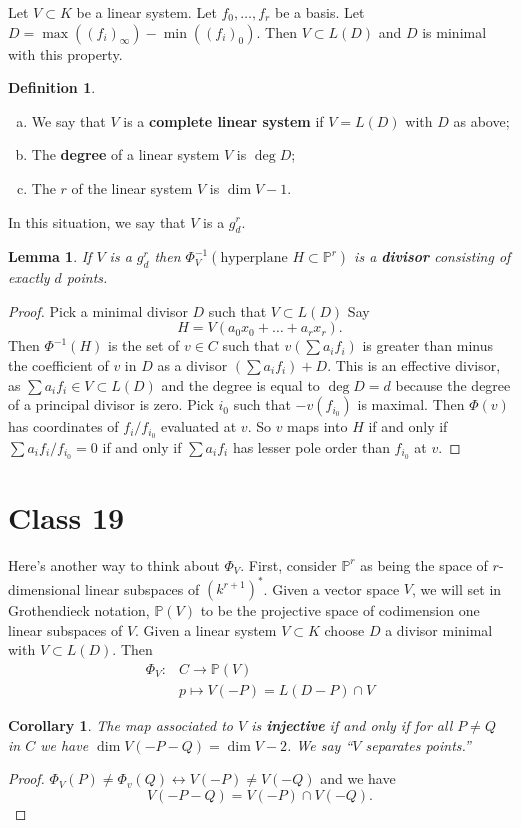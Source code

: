 \documentclass{article}
\newcommand{\Proj}{\mathbb{P}}
\theoremstyle{plain}
\newtheorem{lem}[thm]{Lemma}
\newtheorem{cor}[thm]{Corollary}
\theoremstyle{definition}
\newtheorem{defn}{Definition}
\theoremstyle{remark}
\begin{document}
Let $V\subset K$ be a linear system. Let $f_0,\ldots, f_r$ be a basis. Let $D=\max((f_i)_\infty)-\min((f_i)_0)$. Then $V\subset L(D)$ and $D$ is minimal with this property.

\begin{defn}\hspace{1mm}
\begin{enumerate}[(a)]
\item We say that $V$ is a \textbf{complete linear system} if $V=L(D)$ with $D$ as above;
\item The \textbf{degree} of a linear system $V$ is $\deg D$;
\item The $r$ of the linear system $V$ is $\dim V-1$.
\end{enumerate}
In this situation, we say that $V$ is a $g_d^r$.
\end{defn}

\begin{lem}
\label{L106}
If $V$ is a $g^r_d$ then $\Phi^{-1}_V(\text{hyperplane }H\subset \Proj^r)$ is a \textbf{divisor} consisting of exactly $d$ points.
\end{lem}
\begin{proof}
Pick a minimal divisor $D$ such that $V\subset L(D)$ Say
\[H=V(a_0x_0+\ldots+a_rx_r).\]
Then $\Phi^{-1}(H)$ is the set of $v\in C$ such that $v(\sum a_i f_i)$ is greater than minus the coefficient of $v$ in $D$ as a divisor $(\sum a_i f_i)+D$. This is an effective divisor, as $\sum a_if_i\in V\subset L(D)$ and the degree is equal to $\deg D=d$ because the degree of a principal divisor is zero. Pick $i_0$ such that $-v(f_{i_0})$ is maximal. Then $\Phi(v)$ has coordinates of $f_i/f_{i_0}$ evaluated at $v$. So $v$ maps into $H$ if and only if $\sum a_if_i/f_{i_0}=0$ if and only if $\sum a_i f_i$ has lesser pole order than $f_{i_0}$ at $v$.
\end{proof}

\section*{Class 19}

Here's another way to think about $\Phi_V$. First, consider $\Proj^r$ as being the space of $r$-dimensional linear subspaces of $(k^{r+1})^*$. Given a vector space $V$, we will set in Grothendieck notation, $\Proj(V)$ to be the projective space of codimension one linear subspaces of $V$. Given a linear system $V\subset K$ choose $D$ a divisor minimal with $V\subset L(D)$. Then
\begin{align*}
\Phi_V:&C\longrightarrow \Proj(V)\\
&p \mapsto V(-P)=L(D-P)\cap V
\end{align*}
\begin{cor}
\label{L107}
The map associated to $V$ is \textbf{injective} if and only if for all $P\neq Q$ in $C$ we have $\dim V(-P-Q)=\dim V-2$. We say ``$V$ separates points.''
\end{cor}
\begin{proof}
$\Phi_V(P)\neq\Phi_v(Q)\leftrightarrow V(-P)\neq V(-Q)$ and we have
\[V(-P-Q)=V(-P)\cap V(-Q).\]
\end{proof}
\end{document}
